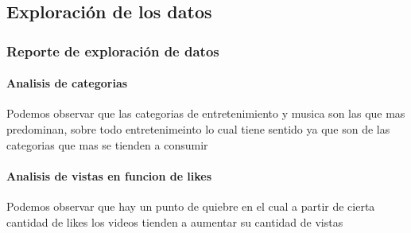 \newpage
\subsection{Exploración de los datos}
    \subsubsection{Reporte de exploración de datos}

        \paragraph{Analisis de categorias}
            \begin{figure}[ht]
            \end{figure}
        \FloatBarrier
        Podemos observar que las categorias de entretenimiento y musica son las
        que mas predominan, sobre todo entretenimeinto lo cual tiene sentido
        ya que son de las categorias que mas se tienden a consumir
        \newpage
        \paragraph{Analisis de vistas en funcion de likes}
            \begin{figure}[ht]
            \end{figure}
        \FloatBarrier
        Podemos observar que hay un punto de quiebre en el cual a partir de
        cierta cantidad de likes los videos tienden a aumentar su cantidad
        de vistas
        \newpage

